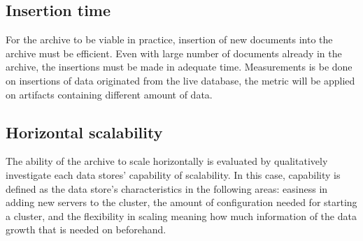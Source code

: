 \subsection{Insertion time}
For the archive to be viable in practice, insertion of new documents into the archive must be efficient. Even with large number of documents already in the archive, the insertions must be made in adequate time. Measurements is be done on insertions of data originated from the live database, the metric will be applied on artifacts containing different amount of data.

\subsection{Horizontal scalability}
The ability of the archive to scale horizontally is evaluated by qualitatively investigate each data stores' capability of scalability. In this case, capability is defined as the data store's characteristics in the following areas: easiness in adding new servers to the cluster, the amount of configuration needed for starting a cluster, and the flexibility in scaling meaning how much information of the data growth that is needed on beforehand.  
